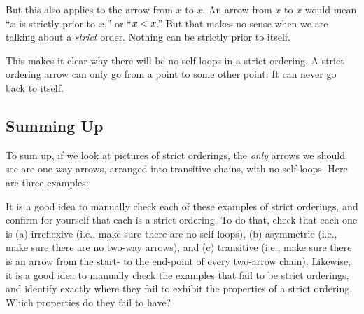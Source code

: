 \documentclass[../../../main.tex]{subfiles}
\begin{document}
But this also applies to the arrow from $x$ to $x$. An arrow from $x$ to $x$ would mean ``$x$ is strictly prior to $x$,'' or ``$x \strictorder/ x$.'' But that makes no sense when we are talking about a \emph{strict} order. Nothing can be strictly prior to itself. 

This makes it clear why there will be no self-loops in a strict ordering. A strict ordering arrow can only go from a point to some other point. It can never go back to itself.


\subsection{Summing Up}

To sum up, if we look at pictures of strict orderings, the \emph{only} arrows we should see are one-way arrows, arranged into transitive chains, with no self-loops. Here are three examples:

\begin{aside}
  \begin{remark}
    It is a good idea to manually check each of these examples of strict orderings, and confirm for yourself that each is a strict ordering. To do that, check that each one is (a) irreflexive (i.e., make sure there are no self-loops), (b) asymmetric (i.e., make sure there are no two-way arrows), and (c) transitive (i.e., make sure there is an arrow from the start- to the end-point of every two-arrow chain). Likewise, it is a good idea to manually check the examples that fail to be strict orderings, and identify exactly where they fail to exhibit the properties of a strict ordering. Which properties do they fail to have?
  \end{remark}
\end{aside}
\end{document}

